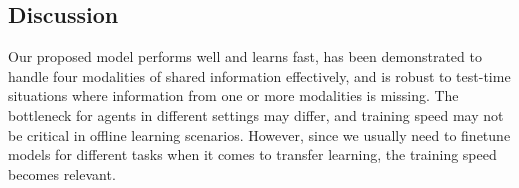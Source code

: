 \documentclass[sigconf,natbib=true,anonymous=true]{acmart}
\newcommand{\todokdinline}[1]{\todo[color=red!20,inline]{{KD: \small #1}}}
\begin{document}







\subsection{Discussion}
Our proposed model performs well and learns fast, has been demonstrated to handle four modalities of shared information effectively, and is robust to test-time situations where information from one or more modalities is missing. 
The bottleneck for agents in different settings may differ, and training speed may not be critical in offline learning scenarios. However, since we usually need to finetune models for different tasks when it comes to transfer learning, the training speed becomes relevant.
\end{document}
